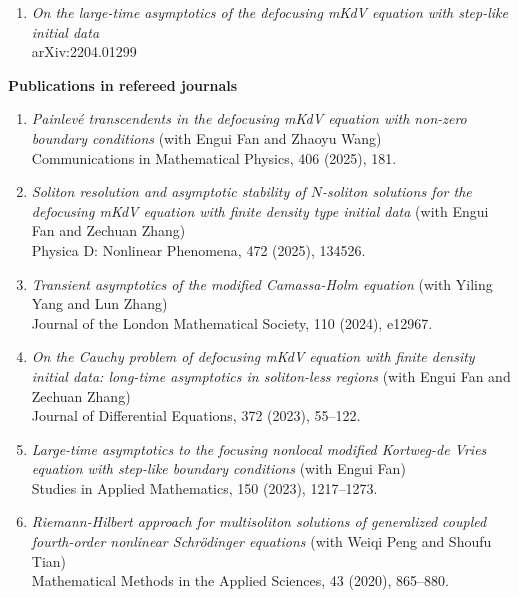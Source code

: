 \documentclass[margin]{res}
\begin{document}
\begin{resume}
\begin{enumerate}[1.]
    \item {\sl On the large-time asymptotics of the defocusing mKdV equation with step-like initial data} \\
    arXiv:2204.01299
\end{enumerate}

\textbf{Publications in refereed journals}
\begin{enumerate}[1.]
    \item {\sl Painlev\'{e} transcendents in the defocusing mKdV equation with non-zero boundary conditions} (with Engui Fan and Zhaoyu Wang)\\
    Communications in Mathematical Physics, 406 (2025), 181.

    \item {\sl Soliton resolution and asymptotic stability of $N$-soliton solutions for the defocusing mKdV equation with finite density type initial data} (with Engui Fan and Zechuan Zhang)\\ 
    Physica D: Nonlinear Phenomena, 472 (2025), 134526. 

    \item {\sl Transient asymptotics of the modified Camassa-Holm equation} (with Yiling Yang and Lun Zhang) \\
    Journal of the London Mathematical Society, 110 (2024), e12967. 

    \item {\sl On the Cauchy problem of defocusing mKdV equation with finite density initial data: long-time asymptotics in soliton-less regions} (with Engui Fan and Zechuan Zhang)\\
    Journal of Differential Equations, 372 (2023), 55--122.

    \item {\sl Large-time asymptotics to the focusing nonlocal modified Kortweg-de Vries equation with step-like boundary conditions} (with Engui Fan)\\
    Studies in Applied Mathematics, 150 (2023), 1217--1273. 
    
    \item {\sl Riemann-Hilbert approach for multisoliton solutions of generalized coupled fourth-order nonlinear Schr\"odinger equations}
    (with Weiqi Peng and Shoufu Tian)\\
    Mathematical Methods in the Applied Sciences, 43 (2020), 865--880.
\end{enumerate}


\end{resume}
\end{document}
